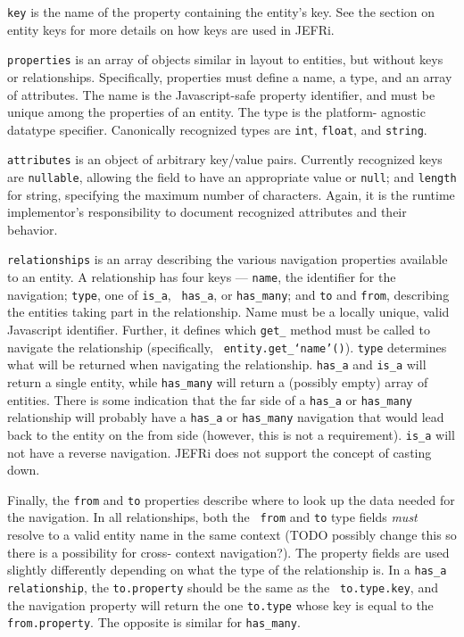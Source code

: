 \documentclass{article}
\newcommand{\ilcode}{\tt}
\begin{document}
{\ilcode key} is the name of the property containing the entity's key. See the
section on entity keys for more details on how keys are used in JEFRi.

{\ilcode properties} is an array of objects similar in layout to entities, but
without keys or relationships. Specifically, properties must define a name, a
type, and an array of attributes. The name is the Javascript-safe property
identifier, and must be unique among the properties of an entity. The type is
the platform- agnostic datatype specifier. Canonically recognized types are
{\ilcode int}, {\ilcode float}, and {\ilcode string}.

{\ilcode attributes} is an object of arbitrary key/value pairs. Currently
recognized keys are {\ilcode nullable}, allowing the field to have an
appropriate value or {\ilcode null}; and {\ilcode length} for string, specifying
the maximum number of characters. Again, it is the runtime implementor's
responsibility to document recognized attributes and their behavior.

{\ilcode relationships} is an array describing the various navigation properties
available to an entity. A relationship has four keys --- {\ilcode name}, the
identifier for the navigation; {\ilcode type}, one of {\ilcode is\_a}, {\ilcode
has\_a}, or {\ilcode has\_many}; and {\ilcode to} and {\ilcode from}, describing
the entities taking part in the relationship. Name must be a locally unique,
valid Javascript identifier. Further, it defines which {\ilcode get\_} method
must be called to navigate the relationship (specifically, {\ilcode
entity.get\_`name'()}). {\ilcode type} determines what will be returned when
navigating the relationship. {\ilcode has\_a} and {\ilcode is\_a} will return a
single entity, while {\ilcode has\_many} will return a (possibly empty) array of
entities. There is some indication that the far side of a {\ilcode has\_a} or
{\ilcode has\_many} relationship will probably have a {\ilcode has\_a} or
{\ilcode has\_many} navigation that would lead back to the entity on the from
side (however, this is not a requirement). {\ilcode is\_a} will not have a
reverse navigation. JEFRi does not support the concept of casting down.

Finally, the {\ilcode from} and {\ilcode to} properties describe where to look
up the data needed for the navigation. In all relationships, both the {\ilcode
from} and {\ilcode to} type fields {\it must} resolve to a valid entity name in
the same context (TODO possibly change this so there is a possibility for cross-
context navigation?). The property fields are used slightly differently
depending on what the type of the relationship is. In a {\ilcode has\_a
relationship}, the {\ilcode to.property} should be the same as the {\ilcode
to.type.key}, and the navigation property will return the one {\ilcode to.type}
whose key is equal to the {\ilcode from.property}. The opposite is similar for
{\ilcode has\_many}.
\end{document}
